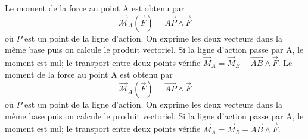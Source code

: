\begin{corrigebox}
Le moment de la force au point A est obtenu par
            \[\boxed{\vec{\mathcal M}_{A}(\vec F)=
            \overrightarrow{AP}\wedge\vec F}\]
            où $P$ est un point de la ligne d'action. On exprime les deux vecteurs dans
            la même base puis on calcule le produit vectoriel. Si la ligne d'action passe
            par A, le moment est nul; le transport entre deux points vérifie
            $\vec M_A=\vec M_B+\overrightarrow{AB}\wedge\vec F$.
Le moment de la force au point A est obtenu par
            \[\boxed{\vec{\mathcal M}_{A}(\vec F)=
            \overrightarrow{AP}\wedge\vec F}\]
            où $P$ est un point de la ligne d'action. On exprime les deux vecteurs dans
            la même base puis on calcule le produit vectoriel. Si la ligne d'action passe
            par A, le moment est nul; le transport entre deux points vérifie
            $\vec M_A=\vec M_B+\overrightarrow{AB}\wedge\vec F$.
\end{corrigebox}

